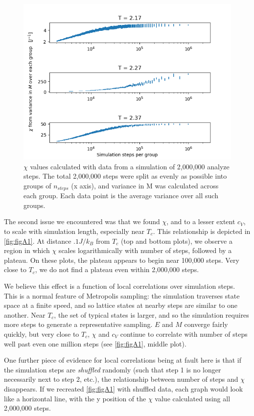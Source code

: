 \documentclass[letter,scriptaddress,twocolumn, prl,nofootinbib]{revtex4}
\begin{document}
\begin{figure}[h]
	\begin{center}
		\includegraphics[width=.4\textwidth]{figs/figA1.png}
		\caption{$\chi$ values calculated with data from a simulation of 2,000,000 analyze steps. The total 2,000,000 steps were split as evenly as possible into groups of $n_{steps}$ (x axis), and variance in M was calculated across each group. Each data point is the average variance over all such groups.}
		\label{fig:figA1}
	\end{center}
\end{figure}

The second issue we encountered was that we found $\chi$, and to a lesser extent $c_V$, to scale with simulation length, especially near $T_c$. This relationship is depicted in \autoref{fig:figA1}. At distance $.1 J/k_B$ from $T_c$ (top and bottom plots), we observe a region in which $\chi$ scales logarithmically with number of steps, followed by a plateau. On these plots, the plateau appears to begin near 100,000 steps. Very close to $T_c$, we do not find a plateau even within 2,000,000 steps.

We believe this effect is a function of local correlations over simulation steps. This is a normal feature of Metropolis sampling: the simulation traverses state space at a finite speed, and so lattice states at nearby steps are similar to one another. Near $T_c$, the set of typical states is larger, and so the simulation requires more steps to generate a representative sampling. $E$ and $M$ converge fairly quickly, but very close to $T_c$, $\chi$ and $c_V$ continue to correlate with number of steps well past even one million steps (see \autoref{fig:figA1}, middle plot).

One further piece of evidence for local correlations being at fault here is that if the simulation steps are \textit{shuffled} randomly (such that step 1 is no longer necessarily next to step 2, etc.), the relationship between number of steps and $\chi$ disappears. If we recreated \autoref{fig:figA1} with shuffled data, each graph would look like a horizontal line, with the y position of the $\chi$ value calculated using all 2,000,000 steps.
\end{document}
